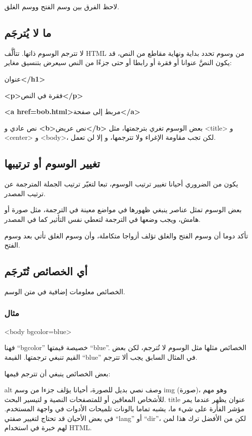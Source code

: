 لاحظ الفرق بين وسم الفتح ووسم الغلق.

\subsection{ما لا يُترجَم}
لا تترجم الوسوم ذاتها. تتألَّف HTML من وسوم تحدد بداية ونهاية مقاطع من
النص، قد يكون النصَّ عنوانا أو فقرة أو رابطا أو حتى جزءًا من النص سيعرض
بتنسيق مغاير:

\startitemize[1]
\item {\bf <h1>}عنوان{\bf </h1>}
\item {\bf <p>}فقرة في النص{\bf </p>}
\item {\bf <a href=bob.html>}مربط إلى صفحة{\bf </a>}
\item نص عادي و {\bf <b>}نص عريض{\bf </b>}
\stopitemize
بعض الوسوم تغري بترجمتها، مثل <title> و <center> و <body>، لكن تجب
مقاومة الإغراء ولا تترجمها، و إلا لن تعمل.

\subsection{تغيير الوسوم أو ترتيبها}
يكون من الضروري أحيانا تغيير ترتيب الوسوم، تبعا لتغيّر ترتيب الجملة
المترجمة عن ترتيب المصدر.

بعض الوسوم تمثل عناصر ينبغي ظهورها في مواضع معينة في الترجمة، مثل صورة
أو هامش، ويجب وضعها في الترجمة لتعطي نفس التأثير كما في المصدر.

تأكد دوما أن وسوم الفتح والغلق تؤلف أزواجا متكاملة، وأن وسوم الغلق تأتي
بعد وسوم الفتح.

\subsection{أي الخصائص تُتَرجَم}
الخصائص معلومات إضافية في متن الوسم.

\subsubsection{مثال}
<body bgcolor=blue>

فهنا “bgcolor” خصيصة قيمتها “blue”. الخصائص مثلها مثل الوسوم لا تُترجم،
لكن بعض القيم تنبغي ترجمتها. القيمة “blue” في المثال السابق يجب ألا
تترجم.

بعض الخصائص ينبغي أن تترجم قيمها:

\starttable[|l|l|]
\HL
\NC {} \NC {}\NC\AR
\HL
\NC alt  \NC وصف نصي بديل للصورة، أحيانا يؤلف جزءا من وسم img (صورة)،
وهو مهم للأشخاص المعاقين أو للمتصفحات النصية و لتيسير البحث.\NC\AR
\HL
\NC title  \NC عنوان يظهر عندما يمر مؤشر الفأرة على شيء ما، يشبه تماما
بالونات تلميحات الأدوات في واجهة المستخدم.\NC\AR
\HL
\stoptable
في بعض الأحيان قد تحتاج لتغيير صفتي “lang” أو “dir”، لكن من الأفضل ترك
هذا لمن لهم خبرة في استخدام HTML.

